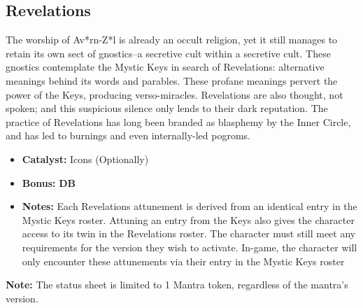 \subsection{Revelations}
The worship of Av*rn-Z*l is already an occult religion, yet it still manages to retain its own sect of gnostics--a secretive cult within a secretive cult. These gnostics contemplate the Mystic Keys in search of Revelations: alternative meanings behind its words and parables. These profane meanings pervert the power of the Keys, producing verso-miracles. Revelations are also thought, not spoken; and this suspicious silence only lends to their dark reputation. The practice of Revelations has long been branded as blasphemy by the Inner Circle, and has led to burnings and even internally-led pogroms.

\begin{itemize}
\item \textbf{Catalyst:} Icons (Optionally)
\item \textbf{Bonus:} \textbf{DB}
\item \textbf{Notes:} Each Revelations attunement is derived from an identical entry in the Mystic Keys roster. Attuning an entry from the Keys also gives the character access to its twin in the Revelations roster. The character must still meet any requirements for the version they wish to activate. In-game, the character will only encounter these attunements via their entry in the Mystic Keys roster
\end{itemize}

\begin{tcolorbox}
\textbf{Note:} The status sheet is limited to 1 Mantra token, regardless of the mantra’s version.
\end{tcolorbox}

